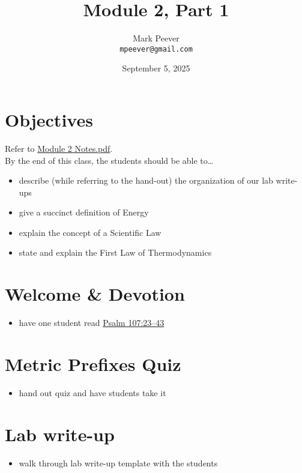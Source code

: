 \documentclass[10pt, oneside]{article}   	%
\title{Module 2, Part 1}
\author{Mark Peever\\ \texttt{mpeever@gmail.com}}
\date{September 5, 2025}
\begin{document}
\maketitle

\section*{Objectives}
Refer to \href{https://drive.google.com/file/d/1lXFrIbob_UusJJQ4y8gLQMyNPjURZ2zt/view?usp=drive_link}{Module 2 Notes.pdf}.\\

By the end of this class, the students should be able to\ldots
\begin{itemize}
\item describe (while referring to the hand-out) the organization of our lab write-ups
\item give a succinct definition of Energy
\item explain the concept of a Scientific Law
\item state and explain the First Law of Thermodynamics
\end{itemize}

\section*{Welcome \& Devotion}
\begin{itemize}
\item have one student read \href{https://www.biblegateway.com/passage/?search=Psalm\%20107\&version=LSB}{Psalm 107:23--43}
\end{itemize}

\section*{Metric Prefixes Quiz}
\begin{itemize}
\item hand out quiz and have students take it 
\end{itemize}

\section*{Lab write-up}
\begin{itemize}
\item walk through lab write-up template with the students
\end{itemize}
\end{document}
